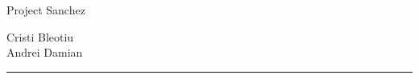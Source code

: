 \begin{titlepage}
	\begin{addmargin}[-1cm]{-1cm}
    \begin{center}
		\parbox[t]{0.93\textwidth}{ %
			\parbox[t]{0.91\textwidth}{ %
				\raggedleft %
				\fontsize{50pt}{80pt}\selectfont %
				\vspace{0.7cm} %
				
				Project Sanchez
				
				\vspace{0.7cm} %
			}
		}
	
	\vfill %
	
	
	\parbox[t]{0.93\textwidth}{ %
		\raggedleft %
		\large %
		{\Large Cristi Bleotiu}\\[4pt] %
		{\Large Andrei Damian}\\[4pt]
		
		\hfill\rule{0.2\linewidth}{1pt}%
	}
	
	\vfill
    \end{center}  
  \end{addmargin}       
\end{titlepage}   
